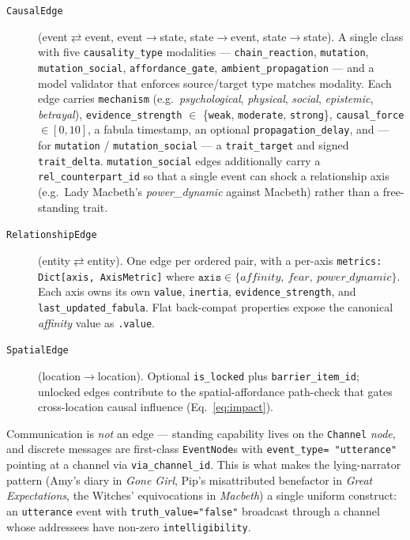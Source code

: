 \documentclass[11pt]{article}
\begin{document}
\begin{description}
  \item[\texttt{CausalEdge}] (event$\rightleftarrows$event,
        event$\to$state, state$\to$event, state$\to$state). A
        single class with five \texttt{causality\_type}
        modalities --- \texttt{chain\_reaction},
        \texttt{mutation}, \texttt{mutation\_social},
        \texttt{affordance\_gate}, \texttt{ambient\_propagation}
        --- and a model validator that enforces source/target
        type matches modality. Each edge carries
        \texttt{mechanism} (e.g.\ \textit{psychological},
        \textit{physical}, \textit{social}, \textit{epistemic},
        \textit{betrayal}), \texttt{evidence\_strength} $\in$
        \{\texttt{weak}, \texttt{moderate}, \texttt{strong}\},
        \texttt{causal\_force} $\in [0, 10]$, a fabula
        timestamp, an optional \texttt{propagation\_delay}, and
        --- for \texttt{mutation} / \texttt{mutation\_social} ---
        a \texttt{trait\_target} and signed
        \texttt{trait\_delta}. \texttt{mutation\_social} edges
        additionally carry a \texttt{rel\_counterpart\_id} so
        that a single event can shock a relationship axis
        (e.g.\ Lady Macbeth's \emph{power\_dynamic} against
        Macbeth) rather than a free-standing trait.
  \item[\texttt{RelationshipEdge}]
        (entity$\rightleftarrows$entity). One edge per ordered
        pair, with a per-axis
        \texttt{metrics: Dict[axis, AxisMetric]} where
        $\texttt{axis} \in \{\textit{affinity},\
        \textit{fear},\ \textit{power\_dynamic}\}$. Each axis
        owns its own \texttt{value}, \texttt{inertia},
        \texttt{evidence\_strength}, and
        \texttt{last\_updated\_fabula}. Flat back-compat
        properties expose the canonical
        \emph{affinity} value as \texttt{.value}.
  \item[\texttt{SpatialEdge}] (location$\to$location). Optional
        \texttt{is\_locked} plus \texttt{barrier\_item\_id};
        unlocked edges contribute to the spatial-affordance
        path-check that gates cross-location causal influence
        (Eq.~\ref{eq:impact}).
\end{description}

Communication is \emph{not} an edge --- standing capability lives
on the \texttt{Channel} \emph{node}, and discrete messages are
first-class \texttt{EventNode}s with \texttt{event\_type=
"utterance"} pointing at a channel via \texttt{via\_channel\_id}.
This is what makes the lying-narrator pattern (Amy's diary in
\emph{Gone Girl}, Pip's misattributed benefactor in \emph{Great
Expectations}, the Witches' equivocations in \emph{Macbeth}) a
single uniform construct: an \texttt{utterance} event with
\texttt{truth\_value="false"} broadcast through a channel whose
addressees have non-zero \texttt{intelligibility}.
\end{document}
